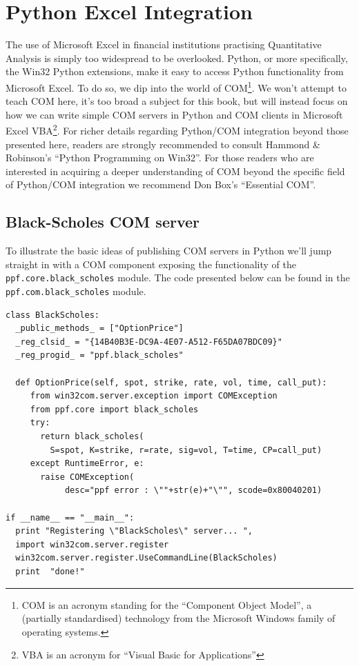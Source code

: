 \chapter{Python Excel Integration}\label{ch:python-excel-integration}

The use of Microsoft Excel in financial institutions practising
Quantitative Analysis is simply too widespread to be
overlooked. Python, or more specifically, the Win32 Python extensions,
make it easy to access Python functionality from Microsoft Excel. To
do so, we dip into the world of COM\footnote{COM is an acronym
standing for the ``Component Object Model'', a (partially
standardised) technology from the Microsoft Windows family of
operating systems.}. We won't attempt to teach COM here, it's too
broad a subject for this book, but will instead focus on how we can
write simple COM servers in Python and COM clients in Microsoft Excel
VBA\footnote{VBA is an acronym for ``Visual Basic for
Applications''}. For richer details regarding Python/COM integration
beyond those presented here, readers are strongly recommended to consult
Hammond \& Robinson's ``Python Programming on
Win32''\cite{book:HAMMOND}. For those readers who are interested in acquiring a
deeper understanding of COM beyond the specific field of Python/COM
integration we recommend Don Box's ``Essential
COM''\cite{book:BOX}.

\section{Black-Scholes COM server}\label{sec:black-scholes-com-server}

To illustrate the basic ideas of publishing COM servers in Python
we'll jump straight in with a COM component exposing the functionality
of the \\
\verb|ppf.core.black_scholes| module. The code presented below can be
found in the \verb|ppf.com.black_scholes| module.

\begin{verbatim}
class BlackScholes:
  _public_methods_ = ["OptionPrice"]
  _reg_clsid_ = "{14B40B3E-DC9A-4E07-A512-F65DA07BDC09}"
  _reg_progid_ = "ppf.black_scholes"

  def OptionPrice(self, spot, strike, rate, vol, time, call_put):
     from win32com.server.exception import COMException
     from ppf.core import black_scholes
     try:
       return black_scholes(
         S=spot, K=strike, r=rate, sig=vol, T=time, CP=call_put)
     except RuntimeError, e:
       raise COMException(
            desc="ppf error : \""+str(e)+"\"", scode=0x80040201)

if __name__ == "__main__":
  print "Registering \"BlackScholes\" server... ",
  import win32com.server.register
  win32com.server.register.UseCommandLine(BlackScholes)
  print  "done!"
\end{verbatim}

